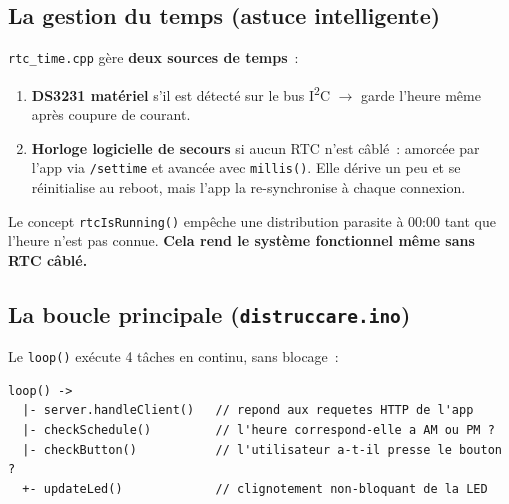 \documentclass[11pt,a4paper]{article}
\begin{document}
\subsection{La gestion du temps (astuce intelligente)}

\texttt{rtc\_time.cpp} g\`ere \textbf{deux sources de temps}~:
\begin{enumerate}
  \item \textbf{DS3231 mat\'eriel} s'il est d\'etect\'e sur le bus I\textsuperscript{2}C
        $\rightarrow$ garde l'heure m\^eme apr\`es coupure de courant.
  \item \textbf{Horloge logicielle de secours} si aucun RTC n'est c\^abl\'e~: amorc\'ee
        par l'app via \texttt{/settime} et avanc\'ee avec \texttt{millis()}. Elle d\'erive
        un peu et se r\'einitialise au reboot, mais l'app la re-synchronise \`a chaque
        connexion.
\end{enumerate}

\begin{infobox}
Le concept \texttt{rtcIsRunning()} emp\^eche une distribution parasite \`a 00:00 tant que
l'heure n'est pas connue. \textbf{Cela rend le syst\`eme fonctionnel m\^eme sans RTC c\^abl\'e.}
\end{infobox}

\subsection{La boucle principale (\texttt{distruccare.ino})}

Le \texttt{loop()} ex\'ecute 4 t\^aches en continu, sans blocage~:

\begin{lstlisting}
loop() ->
  |- server.handleClient()   // repond aux requetes HTTP de l'app
  |- checkSchedule()         // l'heure correspond-elle a AM ou PM ?
  |- checkButton()           // l'utilisateur a-t-il presse le bouton ?
  +- updateLed()             // clignotement non-bloquant de la LED
\end{lstlisting}
\end{document}
